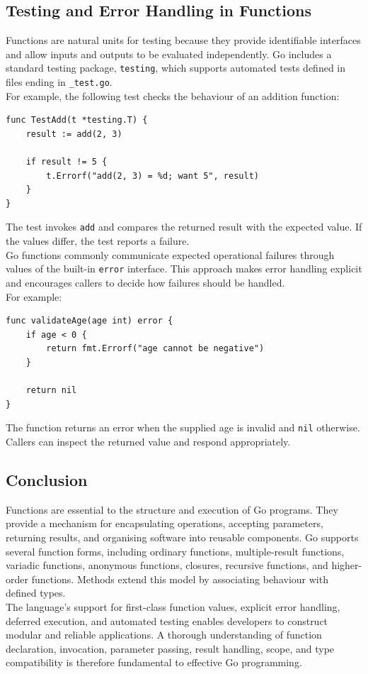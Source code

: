 \subsection{Testing and Error Handling in Functions}

Functions are natural units for testing because they provide identifiable interfaces and allow inputs and outputs to be evaluated independently. Go includes a standard testing package, \texttt{testing}, which supports automated tests defined in files ending in \texttt{\_test.go}.\\

For example, the following test checks the behaviour of an addition function:

\begin{lstlisting}
func TestAdd(t *testing.T) {
    result := add(2, 3)

    if result != 5 {
        t.Errorf("add(2, 3) = %d; want 5", result)
    }
}
\end{lstlisting}

The test invokes \texttt{add} and compares the returned result with the expected value. If the values differ, the test reports a failure.\\

Go functions commonly communicate expected operational failures through values of the built-in \texttt{error} interface. This approach makes error handling explicit and encourages callers to decide how failures should be handled.\\

For example:

\begin{lstlisting}
func validateAge(age int) error {
    if age < 0 {
        return fmt.Errorf("age cannot be negative")
    }

    return nil
}
\end{lstlisting}

The function returns an error when the supplied age is invalid and \texttt{nil} otherwise. Callers can inspect the returned value and respond appropriately.

\subsection{Conclusion}

Functions are essential to the structure and execution of Go programs. They provide a mechanism for encapsulating operations, accepting parameters, returning results, and organising software into reusable components. Go supports several function forms, including ordinary functions, multiple-result functions, variadic functions, anonymous functions, closures, recursive functions, and higher-order functions. Methods extend this model by associating behaviour with defined types.\\

The language's support for first-class function values, explicit error handling, deferred execution, and automated testing enables developers to construct modular and reliable applications. A thorough understanding of function declaration, invocation, parameter passing, result handling, scope, and type compatibility is therefore fundamental to effective Go programming.